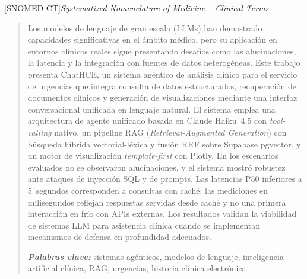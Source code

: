 \documentclass[12pt,a4paper]{report}
\providecommand{\keywords}[1]
{
  \small	
  \textbf{\textit{Palabras clave:\hspace{0.3cm}}} #1
}
\theoremstyle{definition}
\begin{document}
\begin{acronym}[SNOMED CT]
[SNOMED CT]{\textit{Systematized Nomenclature of Medicine -- Clinical Terms}}
\end{acronym}


\clearpage
\begin{abstract}
Los modelos de lenguaje de gran escala (\acs{LLM}s) han demostrado capacidades significativas en el ámbito médico, pero su aplicación en entornos clínicos reales sigue presentando desafíos como las alucinaciones, la latencia y la integración con fuentes de datos heterogéneas. Este trabajo presenta ChatHCE, un sistema agéntico de análisis clínico para el servicio de urgencias que integra consulta de datos estructurados, recuperación de documentos clínicos y generación de visualizaciones mediante una interfaz conversacional unificada en lenguaje natural. El sistema emplea una arquitectura de agente unificado basada en Claude Haiku~4.5 con \textit{tool-calling} nativo, un pipeline \acs{RAG} (\textit{Retrieval-Augmented Generation}) con búsqueda híbrida vectorial-léxica y fusión \acs{RRF} sobre Supabase pgvector, y un motor de visualización \textit{template-first} con Plotly. En los escenarios evaluados no se observaron alucinaciones, y el sistema mostró robustez ante ataques de inyección \acs{SQL} y de prompts. Las latencias P50 inferiores a 5~segundos corresponden a consultas con caché; las mediciones en milisegundos reflejan respuestas servidas desde caché y no una primera interacción en frío con APIs externas. Los resultados validan la viabilidad de sistemas \acs{LLM} para asistencia clínica cuando se implementan mecanismos de defensa en profundidad adecuados.
\vspace{0.5cm}

\keywords{sistemas agénticos, modelos de lenguaje, inteligencia artificial clínica, RAG, urgencias, historia clínica electrónica}
\end{abstract}
\clearpage
\end{document}
